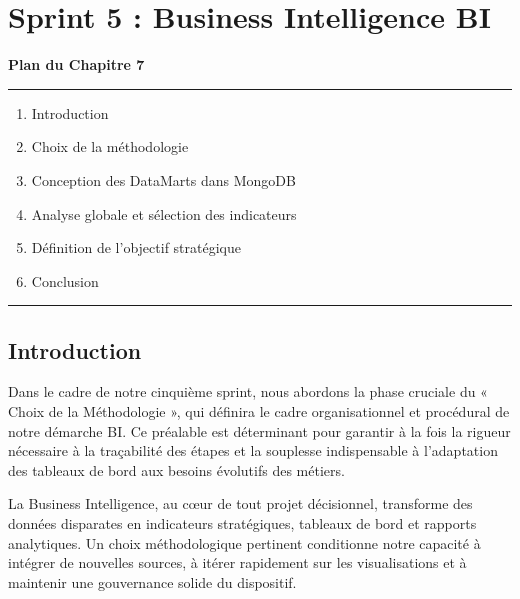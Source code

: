\documentclass[a4paper,11pt]{report}
\begin{document}
\newpage
\chapter{Sprint 5 : Business Intelligence BI}


\vspace*{2cm}

\begin{center}
    {\LARGE \textbf{Plan du Chapitre 7}}
\end{center}

\vspace{1cm}

\noindent
\textcolor{gray!70}{\rule{\textwidth}{0.4pt}}

\vspace{1cm}

\begin{enumerate}[label=\textbf{\large\arabic*.}, leftmargin=*, itemsep=1.2em]
    \item Introduction
    \item Choix de la méthodologie
    \item Conception des DataMarts dans MongoDB
    \item Analyse globale et sélection des indicateurs
    \item Définition de l'objectif stratégique
    \item Conclusion
\end{enumerate}

\vspace{1cm}

\noindent
\textcolor{gray!70}{\rule{\textwidth}{0.4pt}}


\setcounter{section}{0}
\newpage
\vspace{1em}
\section{ Introduction}
Dans le cadre de notre cinquième sprint, nous abordons la phase cruciale du « Choix de la Méthodologie », qui définira le cadre organisationnel et procédural de notre démarche BI. Ce préalable est déterminant pour garantir à la fois la rigueur nécessaire à la traçabilité des étapes et la souplesse indispensable à l’adaptation des tableaux de bord aux besoins évolutifs des métiers.  

La Business Intelligence, au cœur de tout projet décisionnel, transforme des données disparates en indicateurs stratégiques, tableaux de bord et rapports analytiques. Un choix méthodologique pertinent conditionne notre capacité à intégrer de nouvelles sources, à itérer rapidement sur les visualisations et à maintenir une gouvernance solide du dispositif.  
\end{document}
